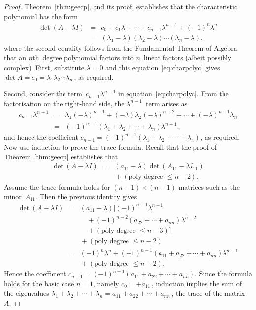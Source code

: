\begin{proof} 
Theorem~\ref{thm:geecp}, and its proof, establishes that the characteristic polynomial has the form
\begin{eqnarray}
\det(A-\lambda I)&=&c_0+c_1\lambda+\cdots+c_{n-1}\lambda^{n-1}+(-1)^n\lambda^n
\nonumber\\&=&(\lambda_1-\lambda)(\lambda_2-\lambda)\cdots(\lambda_n-\lambda),
\label{eq:charpolyc}
\end{eqnarray}
where the second equality follows from the Fundamental Theorem of Algebra that an \(n\)th~degree polynomial factors into \(n\)~linear factors (albeit possibly complex).
First, substitute \(\lambda=0\) and this equation~\eqref{eq:charpolyc} gives \(\det A=c_0=\lambda_1\lambda_2\cdots\lambda_n\)\,, as required.

Second, consider the term~\(c_{n-1}\lambda^{n-1}\) in equation~\eqref{eq:charpolyc}.
From the factorisation on the right-hand side, the \(\lambda^{n-1}\)~term arises as
\begin{eqnarray*}
c_{n-1}\lambda^{n-1}&=&\lambda_1(-\lambda)^{n-1}
+(-\lambda)\lambda_2(-\lambda)^{n-2}
+\cdots+(-\lambda)^{n-1}\lambda_n
\\&=&(-1)^{n-1}(\lambda_1+\lambda_2+\cdots+\lambda_n)\lambda^{n-1},
\end{eqnarray*}
and hence the coefficient \(c_{n-1}=(-1)^{n-1}(\lambda_1+\lambda_2+\cdots+\lambda_n)\), as required.
Now use induction to prove the trace formula.
Recall that the proof of Theorem~\ref{thm:geecp} establishes that
\begin{eqnarray*}
\det(A-\lambda I)
&=&(a_{11}-\lambda)\det (A_{11}-\lambda I_{11})
\\&&{}
+(\text{poly degree }\leq n-2).
\end{eqnarray*}
Assume the trace formula holds for \((n-1)\times(n-1)\) matrices such as the minor~\(A_{11}\). Then the previous identity gives
\begin{eqnarray*}
\det(A-\lambda I)
&=&(a_{11}-\lambda)\big[(-1)^{n-1}\lambda^{n-1}
\\&&\quad{}
+(-1)^{n-2}(a_{22}+\cdots+a_{nn})\lambda^{n-2} 
\\&&\quad{}
+(\text{poly degree }\leq n-3)\big]
\\&&{}
+(\text{poly degree }\leq n-2)
\\&=&(-1)^{n}\lambda^{n}
+(-1)^{n-1}(a_{11}+a_{22}+\cdots+a_{nn})\lambda^{n-1} 
\\&&{}
+(\text{poly degree }\leq n-2).
\end{eqnarray*}
Hence the coefficient \(c_{n-1}=(-1)^{n-1}(a_{11}+a_{22}+\cdots+a_{nn})\).
Since the formula holds for the basic case \(n=1\), namely \(c_0=+a_{11}\)\,, induction implies the sum of the eigenvalues
\(\lambda_1+\lambda_2+\cdots+\lambda_n=a_{11}+a_{22}+\cdots+a_{nn}\)\,, the trace of the matrix~\(A\).
\end{proof}



